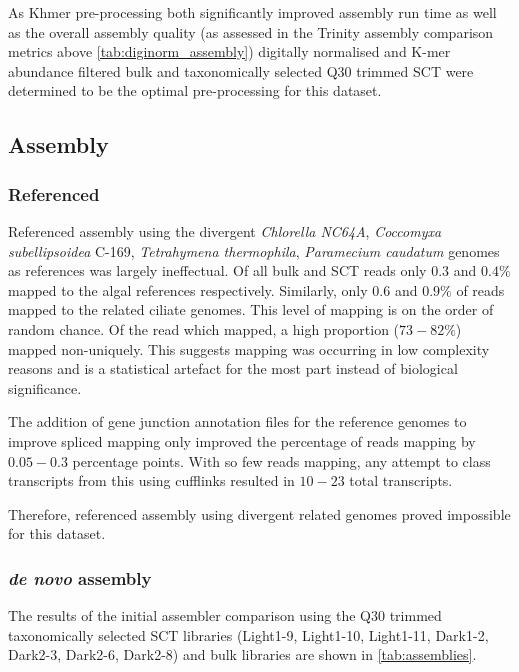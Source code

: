 As Khmer pre-processing both significantly improved assembly run time as well as the overall
assembly quality (as assessed in the Trinity assembly comparison metrics above \cref{tab:diginorm_assembly})
digitally normalised and K-mer abundance filtered bulk and taxonomically selected Q30
trimmed SCT were determined to be the optimal pre-processing for this dataset. 

\subsection{Assembly}

\subsubsection{Referenced}

Referenced assembly using the divergent \textit{Chlorella NC64A},
\textit{Coccomyxa subellipsoidea} C-169, \textit{Tetrahymena thermophila},
\textit{Paramecium caudatum} genomes as references was largely ineffectual.
Of all bulk and SCT reads only \(0.3\) and \(0.4\%\) mapped to the 
algal references respectively.  Similarly, only \(0.6\) and \(0.9\%\) of reads mapped 
to the related ciliate genomes.   This level of mapping is on the order
of random chance. Of the read which mapped, a high proportion (\(73-82\%\))
mapped non-uniquely. 
This suggests mapping was occurring in low complexity reasons and is a statistical
artefact for the most part instead of biological significance.

The addition of gene junction annotation files for the reference genomes to improve
spliced mapping only improved the percentage of reads mapping by \(0.05-0.3\) percentage points.  
With so few reads mapping, any attempt to class transcripts from this using cufflinks 
resulted in \(10-23\) total transcripts.

Therefore, referenced assembly using divergent related genomes proved impossible
for this dataset.

\subsubsection{\textit{de novo} assembly} 

The results of the initial assembler comparison using the Q30 trimmed
taxonomically selected SCT libraries (Light1-9, Light1-10, Light1-11, 
Dark1-2, Dark2-3, Dark2-6, Dark2-8) and bulk libraries are shown in
\cref{tab:assemblies}. 

